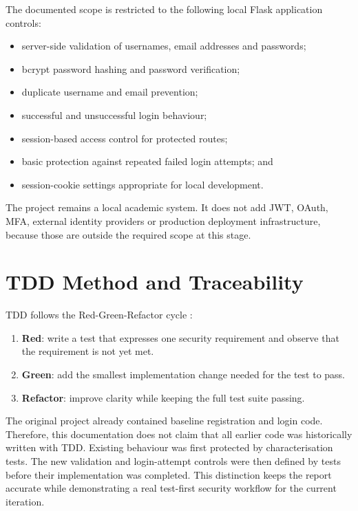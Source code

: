 \documentclass[11pt,a4paper]{article}
\begin{document}
The documented scope is restricted to the following local Flask application
controls:

\begin{itemize}[leftmargin=*]
    \item server-side validation of usernames, email addresses and passwords;
    \item bcrypt password hashing and password verification;
    \item duplicate username and email prevention;
    \item successful and unsuccessful login behaviour;
    \item session-based access control for protected routes;
    \item basic protection against repeated failed login attempts; and
    \item session-cookie settings appropriate for local development.
\end{itemize}

The project remains a local academic system. It does not add JWT, OAuth, MFA,
external identity providers or production deployment infrastructure, because
those are outside the required scope at this stage.

\section{TDD Method and Traceability}

TDD follows the Red-Green-Refactor cycle \cite{beck}:

\begin{enumerate}[leftmargin=*]
    \item \textbf{Red}: write a test that expresses one security requirement and
    observe that the requirement is not yet met.
    \item \textbf{Green}: add the smallest implementation change needed for the
    test to pass.
    \item \textbf{Refactor}: improve clarity while keeping the full test suite
    passing.
\end{enumerate}

The original project already contained baseline registration and login code.
Therefore, this documentation does not claim that all earlier code was
historically written with TDD. Existing behaviour was first protected by
characterisation tests. The new validation and login-attempt controls were then
defined by tests before their implementation was completed. This distinction
keeps the report accurate while demonstrating a real test-first security
workflow for the current iteration.
\end{document}

